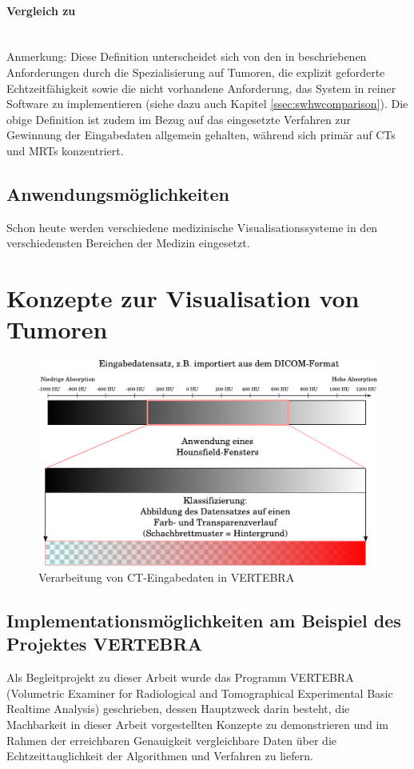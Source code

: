 \documentclass[a4paper,titlepage,12pt]{scrartcl}
\newtheorem[L]{boxedDefinition}{Definition}
\newcommand{\paranl}{$~~$\\}
\begin{document}
\paragraph{Vergleich zu \cite[Kapitel 3.1.1, Seite 17f.]{Bruckner2004}}\paranl
Anmerkung: Diese Definition unterscheidet sich von den in \cite[Kapitel 3.1.1, Seite 17]{Bruckner2004} beschriebenen Anforderungen durch die Spezialisierung auf Tumoren, die explizit geforderte Echtzeitfähigkeit sowie die nicht vorhandene Anforderung, das System in reiner Software zu implementieren (siehe dazu auch Kapitel \vref{ssec:swhwcomparison}). Die obige Definition ist zudem im Bezug auf das eingesetzte Verfahren zur Gewinnung der Eingabedaten allgemein gehalten, während \cite{Bruckner2004} sich primär auf CTs und MRTs konzentriert.

\subsection{Anwendungsmöglichkeiten}\label{ssec:applications}
Schon heute werden verschiedene medizinische Visualisationssysteme in den verschiedensten Bereichen der Medizin eingesetzt.
\section{Konzepte zur Visualisation von Tumoren}\label{ssec:concepts}
\begin{figure}[p]
\begin{center}
\includegraphics[width=\textwidth]{graphics/Classification.pdf}
\caption{Verarbeitung von CT-Eingabedaten in VERTEBRA}
\label{gradientmapping-graphic}
\end{center}
\end{figure}
\subsection{Implementationsmöglichkeiten am Beispiel des Projektes VERTEBRA}\label{ssec:implementations}
Als Begleitprojekt zu dieser Arbeit wurde das Programm VERTEBRA (Volumetric Examiner for Radiological and Tomographical Experimental Basic Realtime Analysis) geschrieben, dessen Hauptzweck darin besteht, die Machbarkeit in dieser Arbeit vorgestellten Konzepte zu demonstrieren und im Rahmen der erreichbaren Genauigkeit vergleichbare Daten über die Echtzeittauglichkeit der Algorithmen und Verfahren zu liefern.
\end{document}
